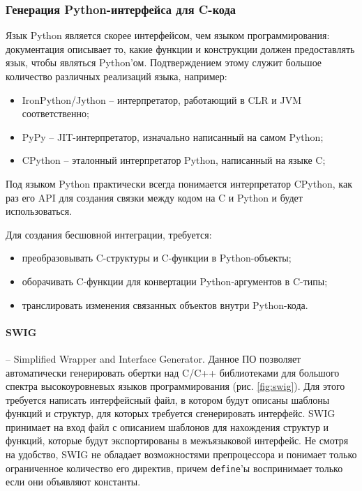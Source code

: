 \subsubsection{Генерация Python-интерфейса для C-кода}\label{sec:ch2/sec1/sub3/sub1}

Язык Python является скорее интерфейсом, чем языком программирования:
документация описывает то, какие функции и конструкции должен предоставлять язык, чтобы являться Python'ом.
Подтверждением этому служит большое количество различных реализаций языка, например:
\begin{itemize}
    \item IronPython/Jython -- интерпретатор, работающий в CLR и JVM соответственно;
    \item PyPy -- JIT-интерпретатор, изначально написанный на самом Python;
    \item CPython -- эталонный интерпретатор Python, написанный на языке C;
\end{itemize}

Под языком Python практически всегда понимается интерпретатор CPython, как раз его
API для создания связки между кодом на C и Python и будет использоваться.

Для создания бесшовной интеграции, требуется:
\begin{itemize}
    \item преобразовывать C-структуры и C-функции в Python-объекты;
    \item оборачивать C-функции для конвертации Python-аргументов в C-типы;
    \item транслировать изменения связанных объектов внутри Python-кода.
\end{itemize}

\paragraph{SWIG} --  Simplified Wrapper and Interface Generator.
Данное ПО позволяет автоматически генерировать обертки над C/C++ библиотеками для
большого спектра высокоуровневых языков программирования (рис. \ref{fig:swig}).
Для этого требуется написать интерфейсный файл, в котором будут описаны шаблоны
функций и структур, для которых требуется сгенерировать интерфейс.
SWIG принимает на вход файл с описанием шаблонов для нахождения структур и
функций, которые будут экспортированы в межъязыковой интерфейс.
Не смотря на удобство, SWIG не обладает возможностями препроцессора и понимает
только ограниченное количество его директив, причем \texttt{define}'ы воспринимает
только если они объявляют константы.

